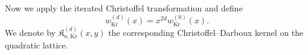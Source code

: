 \documentclass[reqno,11pt]{amsart}
\newcommand{\RR}{\mathbb{R}}
\theoremstyle{plain}
\newtheorem{prop}[thm]{Proposition}
\theoremstyle{definition}
\numberwithin{equation}{section}
\begin{document}
Now we apply the iterated Christoffel transformation and define
\begin{equation}\label{eq:krawtchouk_christoffel}
w_{\mathrm{Kr}}^{(d)}(x)=x^{2d}w_{\mathrm{Kr}}^{(0)}(x).
\end{equation}
We denote by \(\mathfrak K^{(d)}_{n,\mathrm{Kr}}(x,y)\) the corresponding Christoffel--Darboux kernel on the quadratic lattice.

\end{document}
